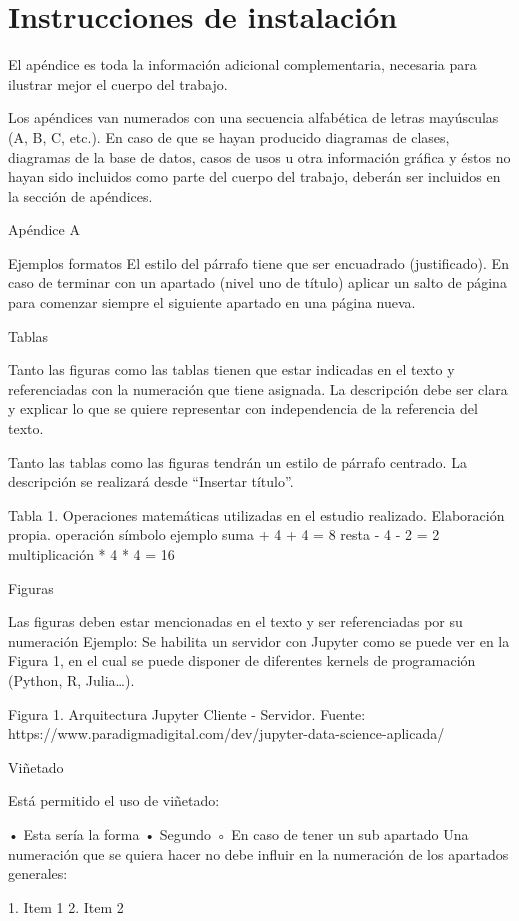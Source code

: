 \chapter{Instrucciones de instalación}\label{ch:appendix_1}


El apéndice es toda la información adicional complementaria, necesaria para ilustrar mejor el cuerpo del trabajo.

Los apéndices van numerados con una secuencia alfabética de letras mayúsculas (A, B, C, etc.). En caso de que se hayan
producido diagramas de clases, diagramas de la base de datos, casos de usos u otra información gráfica y éstos no hayan
sido incluidos como parte del cuerpo del trabajo, deberán ser incluidos en la sección de apéndices.


Apéndice A

Ejemplos formatos
El estilo del párrafo tiene que ser encuadrado (justificado).
En caso de terminar con un apartado (nivel uno de título) aplicar un salto de página para comenzar siempre el siguiente
apartado en una página nueva.

Tablas

Tanto las figuras como las tablas tienen que estar indicadas en el texto y referenciadas con la numeración que tiene
asignada. La descripción debe ser clara y explicar lo que se quiere representar con independencia de la referencia del
texto.

Tanto las tablas como las figuras tendrán un estilo de párrafo centrado. La descripción se realizará desde “Insertar
título”.


Tabla 1. Operaciones matemáticas utilizadas en el estudio realizado. Elaboración propia.
operación
símbolo
ejemplo
suma
+
4 + 4 = 8
resta
-
4 - 2 = 2
multiplicación
*
4 * 4 = 16

Figuras

Las figuras deben estar mencionadas en el texto y ser referenciadas por su numeración Ejemplo: Se habilita un servidor
con Jupyter como se puede ver en la Figura 1, en el cual se puede disponer de diferentes kernels de programación
(Python, R, Julia…).

Figura 1. Arquitectura Jupyter Cliente - Servidor.
Fuente: https://www.paradigmadigital.com/dev/jupyter-data-science-aplicada/


Viñetado

Está permitido el uso de viñetado:

• Esta sería la forma
• Segundo
◦ En caso de tener un sub apartado
Una numeración que se quiera hacer no debe influir en la numeración de los apartados generales:

1. Item 1
2. Item 2
